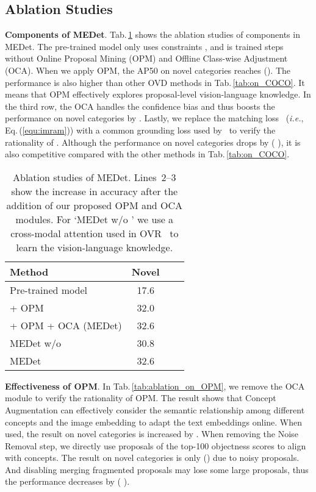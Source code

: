 \documentclass[10pt,twocolumn,letterpaper]{article}
\begin{document}
\subsection{Ablation Studies}
\label{sec:ablation_investigation}
\textbf{Components of MEDet}.
Tab.\,\ref{tab:ablation_on_MEDet} shows the ablation studies of components in MEDet. The pre-trained model only uses constraints , and is trained  steps without Online Proposal Mining (OPM) and Offline Class-wise Adjustment (OCA).
When we apply OPM, the AP50 on novel categories reaches  (). 
The performance is also higher than other OVD methods in Tab.\,\ref{tab:on_COCO}. It means that OPM effectively explores proposal-level vision-language knowledge. 
In the third row, the OCA handles the confidence bias and thus boosts the performance on novel categories by . Lastly, we replace the  matching loss~\cite{imram} (\emph{i.e.}, Eq.\,(\ref{equ:imram})) with a common grounding loss used by~\cite{ovrcnn} to verify the rationality of . Although the performance on novel categories drops by  ( \vs ), it is also competitive compared with the other methods in Tab.\,\ref{tab:on_COCO}.


\begin{table}[t]
    \centering
    \caption{Ablation studies of MEDet. Lines~2--3 show the increase in accuracy after the addition of our proposed OPM and OCA modules. For `MEDet w/o ' we use a cross-modal attention used in OVR~\cite{ovrcnn} to learn the vision-language knowledge.}
    \footnotesize{
        \begin{tabular}{l|c|c|c}
            \toprule
            Method & Novel & \color{gray}{Base} & \color{gray}{All} \\
            \midrule
            Pre-trained model &17.6 &\color{gray}{43.3} &\color{gray}{36.6} \\
+ OPM  & 32.0 &\color{gray}{53.1} &\color{gray}{47.5}  \\
            + OPM + OCA (MEDet)  &32.6 &\color{gray}{53.4} &\color{gray}{47.9}  \\
            \midrule
            MEDet w/o  &30.8 &\color{gray}{52.8} &\color{gray}{47.0} \\
            MEDet &32.6 &\color{gray}{53.4} &\color{gray}{47.9} \\
            \bottomrule
        \end{tabular}
        \label{tab:ablation_on_MEDet}
        }
\end{table}

\textbf{Effectiveness of OPM}.
In Tab.\,\ref{tab:ablation_on_OPM}, we remove the OCA module to verify the rationality of OPM. 
The result shows that Concept Augmentation can effectively consider the semantic relationship among different concepts and the image embedding to adapt the text embeddings online. When used, the result on novel categories is increased by . 
When removing the Noise Removal step, we directly use proposals of the top-100 objectness scores to align with concepts. The result on novel categories is only  () due to noisy proposals. And disabling merging fragmented proposals may lose some large proposals, thus the performance decreases by  ( \vs ).
\end{document}
